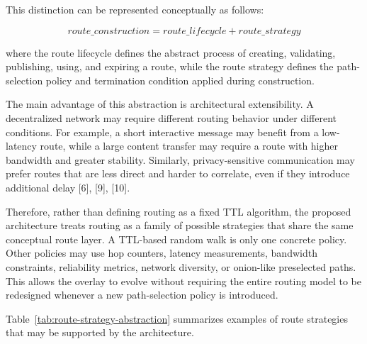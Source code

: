 \documentclass[12pt,a4paper]{article}
\begin{document}
This distinction can be represented conceptually as follows:

\[
route\_construction = route\_lifecycle + route\_strategy
\]

where the route lifecycle defines the abstract process of creating, validating, publishing, using,
and expiring a route, while the route strategy defines the path-selection policy and termination condition applied
during construction.

The main advantage of this abstraction is architectural extensibility. A decentralized
network may require different routing behavior under different conditions. For
example, a short interactive message may benefit from a low-latency route, while a
large content transfer may require a route with higher bandwidth and greater
stability. Similarly, privacy-sensitive communication may prefer routes that are less
direct and harder to correlate, even if they introduce additional delay [6], [9], [10].

Therefore, rather than defining routing as a fixed TTL algorithm, the proposed architecture
treats routing as a family of possible strategies that share the same conceptual route
layer. A TTL-based random walk is only one concrete policy. Other policies may use hop counters,
latency measurements, bandwidth constraints, reliability metrics, network diversity, or onion-like preselected paths.
This allows the overlay to evolve without requiring the entire routing model to
be redesigned whenever a new path-selection policy is introduced.

Table~\ref{tab:route-strategy-abstraction} summarizes examples of route strategies
that may be supported by the architecture.
\end{document}
